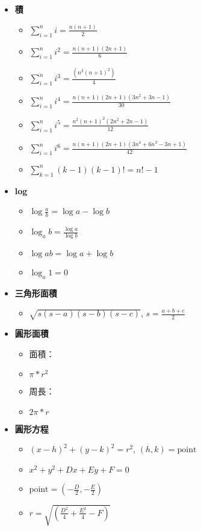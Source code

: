\begin{itemize}
  \item \textbf{積}
  \begin{itemize}
    \item $\sum \limits_{i=1}^n i = \frac{n(n+1)}{2}$
    \item $\sum \limits_{i=1}^n i^2 = \frac{n(n+1)(2n+1)}{6}$
    \item $\sum \limits_{i=1}^n i^3 = \frac{(n^2(n+1)^2)}{4}$
    \item $\sum \limits_{i=1}^n i^4 = \frac{n(n+1)(2n+1)(3n^2+3n-1)}{30}$
    \item $\sum \limits_{i=1}^n i^5 = \frac{n^2(n+1)^2(2n^2+2n-1)}{12}$
    \item $\sum \limits_{i=1}^n i^6 = \frac{n(n+1)(2n+1)(3n^4+6n^3-3n+1)}{42}$
    \item $\sum \limits_{k=1}^n (k-1)(k-1)! = n!-1$
  \end{itemize}
  
  \item \textbf{log}
  \begin{itemize}
    \item $\log\frac{a}{b} = \log a - \log b$
    \item $\log_a b = \frac{\log a}{\log b}$
    \item $\log ab = \log a + \log b$
    \item $\log_a 1 = 0$
  \end{itemize}

  \item \textbf{三角形面積}
  \begin{itemize}
    \item $\sqrt{s(s-a)(s-b)(s-c)}$, $s = \frac{a+b+c}{2}$
  \end{itemize}

  \item \textbf{圓形面積}
  \begin{itemize}
    \item 面積：
    \item $\pi *r^2$
    \item 周長：
    \item $2\pi *r$
  \end{itemize}

  \item \textbf{圓形方程}
  \begin{itemize}
    \item $(x-h)^2+(y-k)^2 = r^2$, $(h, k) = \text{point}$
    \item $x^2 + y^2 + Dx + Ey + F = 0$
    \item $\text{point}=\left(-\frac{D}{2}, -\frac{E}{2}\right)$
    \item $r = \sqrt{\left(\frac{D^2}{4}+\frac{E^2}{4}-F\right)}$
  \end{itemize}


\end{itemize}
